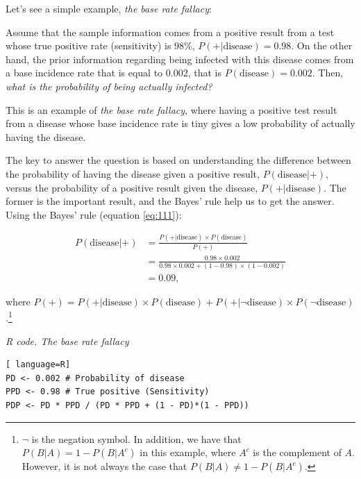 Let's see a simple example, \textit{the base rate fallacy}:

Assume that the sample information comes from a positive result from a test whose true positive rate (sensitivity) is 98\%, $P(+|\text{disease})=0.98$. On the other hand, the prior information regarding being infected with this disease comes from a base incidence rate that is equal to 0.002, that is $P(\text{disease})=0.002$. Then, \textit{what is the probability of being actually infected?}

This is an example of \textit{the base rate fallacy}, where having a positive test result from a disease whose base incidence rate is tiny gives a low probability of actually having the disease.

The key to answer the question is based on understanding the difference between the probability of having the disease given a positive result, $P(\text{disease}|+)$, versus the probability of a positive result given the disease, $P(+|\text{disease})$. The former is the important result, and the Bayes' rule help us to get the answer. Using the Bayes' rule (equation \ref{eq:111}):

\begin{align*}
	P(\text{disease}|+) & = \frac{P(+|\text{disease})\times P(\text{disease})}{P(+)}\\
	& = \frac{0.98 \times 0.002}{0.98 \times 0.002 + (1-0.98) \times (1-0.002)}\\
	& =0.09, 
\end{align*}

where $P(+)=P(+|\text{disease})\times P(\text{disease})+P(+|\lnot\text{disease})\times P( \lnot\text{disease})$.\footnote{$\lnot$ is the negation symbol. In addition, we have that $P(B|A)=1-P(B|A^c)$ in this example, where $A^c$ is the complement of $A$. However, it is not always the case that $P(B|A)\neq 1-P(B|A^c)$.}

\begin{tcolorbox}[enhanced,width=4.67in,center upper,
	fontupper=\large\bfseries,drop shadow southwest,sharp corners]
\textit{R code. The base rate fallacy}
\begin{VF}
\begin{lstlisting}[ language=R]
PD <- 0.002 # Probability of disease
PPD <- 0.98 # True positive (Sensitivity)
PDP <- PD * PPD / (PD * PPD + (1 - PD)*(1 - PPD))
\end{lstlisting}
\end{VF}
\end{tcolorbox}

